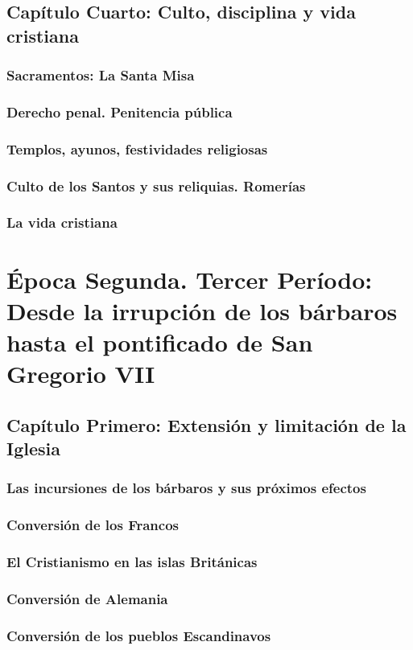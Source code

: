 \raggedbottom{} \documentclass[12pt]{book}
\begin{document}
\chapter{Capítulo Cuarto: Culto, disciplina y vida cristiana}
\section{Sacramentos: La Santa Misa}
\section{Derecho penal. Penitencia pública}
\section{Templos, ayunos, festividades religiosas}
\section{Culto de los Santos y sus reliquias. Romerías}
\section{La vida cristiana}
\part{Época Segunda. Tercer Período: Desde la irrupción de los bárbaros hasta el pontificado de San Gregorio VII}
\chapter{Capítulo Primero: Extensión y limitación de la Iglesia}
\section{Las incursiones de los bárbaros y sus próximos efectos}
\section{Conversión de los Francos}
\section{El Cristianismo en las islas Británicas}
\section{Conversión de Alemania}
\section{Conversión de los pueblos Escandinavos}
\end{document}
